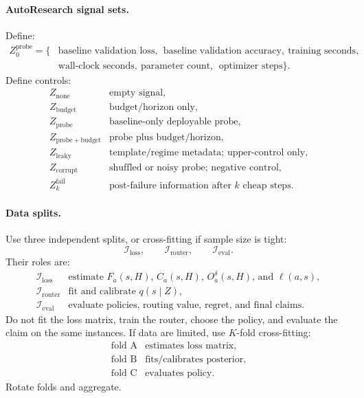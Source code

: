 \documentclass{article}
\begin{document}
\paragraph{AutoResearch signal sets.}
Define:
\[
\begin{aligned}
    Z_0^{\mathrm{probe}}=\{&\text{baseline validation loss},\
    \ \text{baseline validation accuracy},\ \text{training seconds},\\
    &\text{wall-clock seconds},\ \text{parameter count},\
    \ \text{optimizer steps}\}.
\end{aligned}
\]
Define controls:
\[
\begin{array}{ll}
    Z_{\mathrm{none}} & \text{empty signal},\\
    Z_{\mathrm{budget}} & \text{budget/horizon only},\\
    Z_{\mathrm{probe}} & \text{baseline-only deployable probe},\\
    Z_{\mathrm{probe+budget}} & \text{probe plus budget/horizon},\\
    Z_{\mathrm{leaky}} & \text{template/regime metadata; upper-control only},\\
    Z_{\mathrm{corrupt}} & \text{shuffled or noisy probe; negative control},\\
    Z_k^{\mathrm{fail}} & \text{post-failure information after \(k\) cheap steps}.
\end{array}
\]

\paragraph{Data splits.}
Use three independent splits, or cross-fitting if sample size is tight:
\[
    \mathcal I_{\mathrm{loss}},
    \qquad
    \mathcal I_{\mathrm{router}},
    \qquad
    \mathcal I_{\mathrm{eval}}.
\]
Their roles are:
\[
\begin{array}{ll}
    \mathcal I_{\mathrm{loss}} &
    \text{estimate \(F_a(s,H)\), \(C_a(s,H)\), \(O_a^\delta(s,H)\), and \(\ell(a,s)\)},\\
    \mathcal I_{\mathrm{router}} &
    \text{fit and calibrate \(q(s\mid Z)\)},\\
    \mathcal I_{\mathrm{eval}} &
    \text{evaluate policies, routing value, regret, and final claims}.
\end{array}
\]
Do not fit the loss matrix, train the router, choose the policy, and evaluate the claim on
the same instances.
If data are limited, use \(K\)-fold cross-fitting:
\[
\begin{array}{ll}
    \text{fold A} & \text{estimates loss matrix},\\
    \text{fold B} & \text{fits/calibrates posterior},\\
    \text{fold C} & \text{evaluates policy}.
\end{array}
\]
Rotate folds and aggregate.
\end{document}
